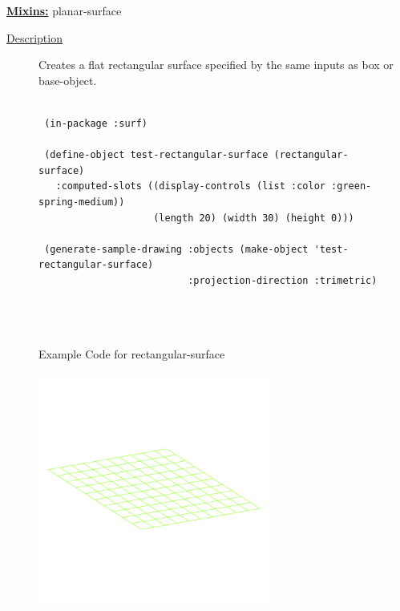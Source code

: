 \documentclass [11pt]{book}
\begin{document}
\begin{itemize}
\textbf{
\underline{Mixins:}} planar-surface





\begin{description}

\item [
\underline{Description}]


Creates a flat rectangular surface specified by the same inputs as box or base-object.



\end{description}




\begin{figure}
\begin{lrbox}{\boxedverb}
\begin{minipage}{\linewidth}
{\small

\begin{verbatim}

 (in-package :surf)

 (define-object test-rectangular-surface (rectangular-surface)
   :computed-slots ((display-controls (list :color :green-spring-medium)) 
                    (length 20) (width 30) (height 0)))
 
 (generate-sample-drawing :objects (make-object 'test-rectangular-surface)
                          :projection-direction :trimetric)


 
\end{verbatim}}
\end{minipage}
\end{lrbox}
\fbox{\usebox{\boxedverb}}

\caption{Example Code for rectangular-surface}

\label{fig:example-code-rectangular-surface}

\end{figure}

\begin{figure}
\begin{center}
\includegraphics[width=3in,height=3in]{../images/example-rectangular-surface.pdf}
\end{center}


\end{figure}
\end{itemize}
\end{document}
